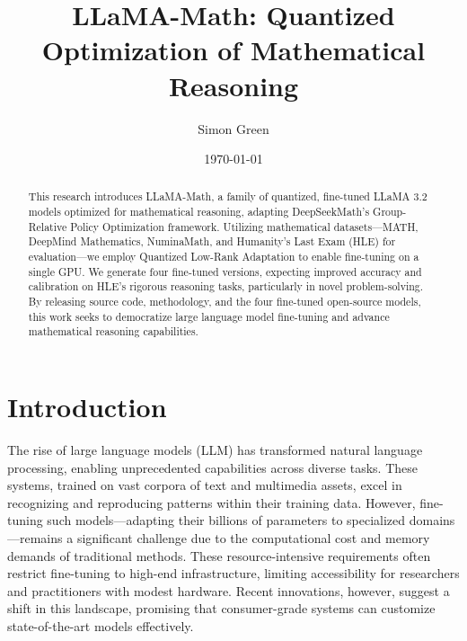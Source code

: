 \documentclass{svproc}
\title{LLaMA-Math: Quantized Optimization of Mathematical Reasoning}
\author{Simon Green\inst{1}}
\institute{
    School of Computing, University of Leeds, UK \\
    \inst{1} MSc, Artificial Intelligence \\
    \email{\{od21sg\}@leeds.ac.uk}
}
\date{\today}
\begin{document}
\maketitle




\begin{abstract}

This research introduces LLaMA-Math, a family of quantized, fine-tuned LLaMA 3.2 models optimized for mathematical reasoning, adapting DeepSeekMath’s Group-Relative Policy Optimization framework. Utilizing mathematical datasets—MATH, DeepMind Mathematics, NuminaMath, and Humanity’s Last Exam (HLE) for evaluation—we employ Quantized Low-Rank Adaptation to enable fine-tuning on a single GPU. We generate four fine-tuned versions, expecting improved accuracy and calibration on HLE’s rigorous reasoning tasks, particularly in novel problem-solving. By releasing source code, methodology, and the four fine-tuned open-source models, this work seeks to democratize large language model  fine-tuning and advance mathematical reasoning capabilities.


\end{abstract}




\section{Introduction}

The rise of large language models (LLM) has transformed natural language processing, enabling unprecedented capabilities across diverse tasks. These systems, trained on vast corpora of text and multimedia assets, excel in recognizing and reproducing patterns within their training data. However, fine-tuning such models—adapting their billions of parameters to specialized domains—remains a significant challenge due to the computational cost and memory demands of traditional methods. These resource-intensive requirements often restrict fine-tuning to high-end infrastructure, limiting accessibility for researchers and practitioners with modest hardware. Recent innovations, however, suggest a shift in this landscape, promising that consumer-grade systems can customize state-of-the-art models effectively.
\end{document}
